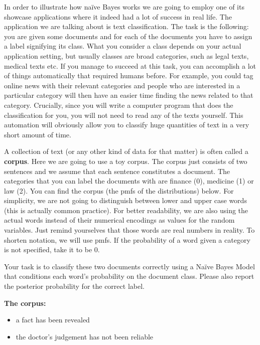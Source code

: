 In order to illustrate how na\"ive Bayes works we are going to employ one of its showcase applications where it indeed had
a lot of success in real life. The application we are talking about is text classification. The task is the following: you
are given some documents and for each of the documents you have to assign a label signifying its class. What you consider
a class depends on your actual application setting, but usually classes are broad categories, such as legal texts, medical
texts etc. If you manage to succeed at this task, you can accomplish a lot of things automatically that required humans before. For example, you could tag online news with their relevant categories and people who are interested in
a particular category will then have an easier time finding the news related to that category. Crucially, since you will
write a computer program that does the classification for you, you will not need to read any of the texts yourself. This automation will obviously allow you to classify huge quantities of text in a very short amount of time.

\begin{Exercise}
A collection of text (or any other kind of data for that matter) is often called a \textbf{corpus}. Here we are going to
use a toy corpus. The corpus just consists of two sentences and we assume that each sentence constitutes
a document.
The categories that you can label the documents with are
finance (0), medicine (1) or law (2). You can find the corpus (the pmfs of the distributions) below. For simplicity, we are not going to distinguish between lower and upper case words (this is actually common practice). For better 
readability, we are also using the actual words instead of their numerical encodings as values for the random 
variables. Just remind yourselves that those words are real numbers in reality. To shorten notation, we
will use pmfs. If the probability of a word given a category is not specified, take it to be 0.


Your task is to classify these two documents correctly using a Na\"ive Bayes Model that conditions each
word's probability on the document class. Please also report the posterior probability for the correct label. 
\end{Exercise}

\newpage
\textbf{The corpus:}
\begin{itemize}
\item a fact has been revealed
\item the doctor's judgement has not been reliable
\end{itemize}


